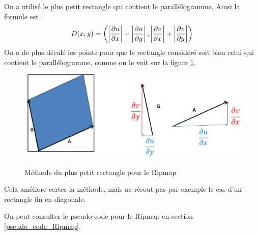 On a utilisé le plus petit rectangle qui contient le parallélogramme. Ainsi la formule est :
$$D(x,y) = \left( \left|\frac{\partial u}{\partial x}\right|+\left|\frac{\partial u}{\partial y}\right|,\left|\frac{\partial v}{\partial x}\right|+\left|\frac{\partial v}{\partial y}\right|\right)$$
On a de plus décalé les points pour que le rectangle considéré soit bien celui qui contient le parallélogramme, comme on le voit sur la figure \ref{methode_distance_ripmap}.

\begin{figure}[h!]
\centering
\caption{Méthode du plus petit rectangle pour le Ripmap}
\includegraphics[scale=0.5]{methode_distance_ripmap.jpg}
\label{methode_distance_ripmap}
\end{figure}

Cela améliore certes la méthode, mais ne résout pas par exemple le cas d'un rectangle fin en diagonale.

On peut consulter le pseudo-code pour le Ripmap en section \ref{pseudo_code_Ripmap}.
